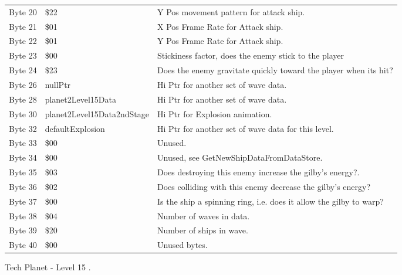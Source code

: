 \begin{figure}[H]
{\begin{adjustbox}{width=12cm}
\begin{tabular}{lll}
 Byte 20 & \$22                        & Y Pos movement pattern for attack ship.                            \\
 Byte 21 & \$01                        & X Pos Frame Rate for Attack ship.                                  \\
 Byte 22 & \$01                        & Y Pos Frame Rate for Attack ship.                                  \\
 Byte 23 & \$00                        & Stickiness factor, does the enemy stick to the player              \\
 Byte 24 & \$23                        & Does the enemy gravitate quickly toward the player when its hit?   \\
 Byte 26 & nullPtr                    & Hi Ptr for another set of wave data.                               \\
 Byte 28 & planet2Level15Data         & Hi Ptr for another set of wave data.                               \\
 Byte 30 & planet2Level15Data2ndStage & Hi Ptr for Explosion animation.                                    \\
 Byte 32 & defaultExplosion           & Hi Ptr for another set of wave data for this level.                \\
 Byte 33 & \$00                        & Unused.                                                            \\
 Byte 34 & \$00                        & Unused, see GetNewShipDataFromDataStore.                           \\
 Byte 35 & \$03                        & Does destroying this enemy increase the gilby's energy?.           \\
 Byte 36 & \$02                        & Does colliding with this enemy decrease the gilby's energy?        \\
 Byte 37 & \$00                        & Is the ship a spinning ring, i.e. does it allow the gilby to warp? \\
 Byte 38 & \$04                        & Number of waves in data.                                           \\
 Byte 39 & \$20                        & Number of ships in wave.                                           \\
 Byte 40 & \$00                        & Unused bytes.                                                      \\
\bottomrule
\end{tabular}

  \end{adjustbox}

  }\caption*{Tech Planet - Level 15
.}
\end{figure}

